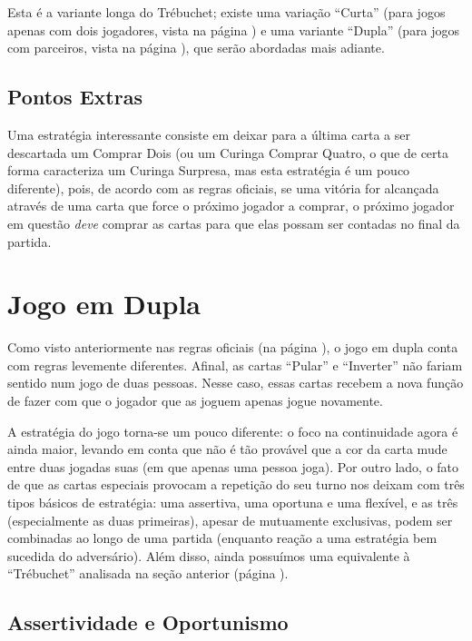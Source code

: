 Esta é a variante longa do Trébuchet; existe uma variação ``Curta'' (para jogos apenas com dois jogadores, vista na página \pageref{trebuchetcurto}) e uma variante ``Dupla'' (para jogos com parceiros, vista na página \pageref{trebuchetduplo}), que serão abordadas mais adiante.

\subsection{Pontos Extras}

Uma estratégia interessante consiste em deixar para a última carta a ser descartada um Comprar Dois (ou um Curinga Comprar Quatro, o que de certa forma caracteriza um Curinga Surpresa, mas esta estratégia é um pouco diferente), pois, de acordo com as regras oficiais, se uma vitória for alcançada através de uma carta que force o próximo jogador a comprar, o próximo jogador em questão \emph{deve} comprar as cartas para que elas possam ser contadas no final da partida.

\section{Jogo em Dupla}

Como visto anteriormente nas regras oficiais (na página \pageref{oficiais}), o jogo em dupla conta com regras levemente diferentes. Afinal, as cartas ``Pular'' e ``Inverter'' não fariam sentido num jogo de duas pessoas. Nesse caso, essas cartas recebem a nova função de fazer com que o jogador que as joguem apenas jogue novamente.

A estratégia do jogo torna-se um pouco diferente: o foco na continuidade agora é ainda maior, levando em conta que não é tão provável que a cor da carta mude entre duas jogadas suas (em que apenas uma pessoa joga). Por outro lado, o fato de que as cartas especiais provocam a repetição do seu turno nos deixam com três tipos básicos de estratégia: uma assertiva, uma oportuna e uma flexível, e as três (especialmente as duas primeiras), apesar de mutuamente exclusivas, podem ser combinadas ao longo de uma partida (enquanto reação a uma estratégia bem sucedida do adversário). Além disso, ainda possuímos uma equivalente à ``Trébuchet'' analisada na seção anterior (página \pageref{trebuchetlongo}).

\subsection{Assertividade e Oportunismo}

